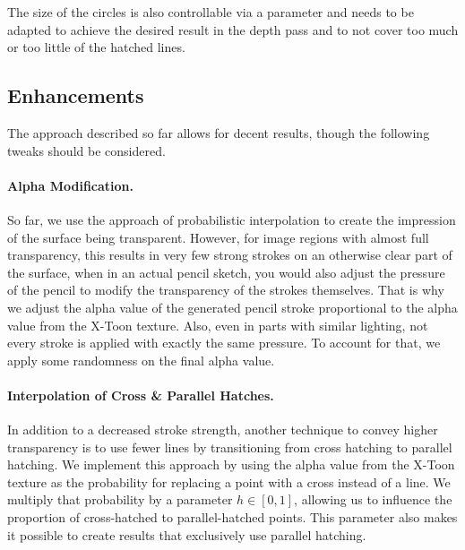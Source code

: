 \documentclass[a4paper,twoside]{article}
\begin{document}
The size of the circles is also controllable via a parameter and needs to be adapted to achieve the desired result in the depth pass and to not cover too much or too little of the hatched lines.



\subsection{Enhancements}
\label{PCNPR:SubSec:Enhancements}
%
The approach described so far allows for decent results, though the following tweaks should be considered.


\paragraph{Alpha Modification.}
%
So far, we use the approach of probabilistic interpolation to create the impression of the surface being transparent.
However, for image regions with almost full transparency, this results in very few strong strokes on an otherwise clear part of the surface, when in an actual pencil sketch, you would also adjust the pressure of the pencil to modify the transparency of the strokes themselves.
That is why we adjust the alpha value of the generated pencil stroke proportional to the alpha value from the X-Toon texture.
Also, even in parts with similar lighting, not every stroke is applied with exactly the same pressure. To account for that, we apply some randomness on the final alpha value.

\paragraph{Interpolation of Cross \& Parallel Hatches.}
\label{PCNPR:Sec:CrossParallelInterpolation}
%
In addition to a decreased stroke strength, another technique to convey higher transparency is to use fewer lines by transitioning from cross hatching to parallel hatching.
We implement this approach by using the alpha value from the X-Toon texture as the probability for replacing a point with a cross instead of a line.
We multiply that probability by a parameter $h\in [0,1]$, allowing us to influence the proportion of cross-hatched to parallel-hatched points.
This parameter also makes it possible to create results that exclusively use parallel hatching.
\end{document}
